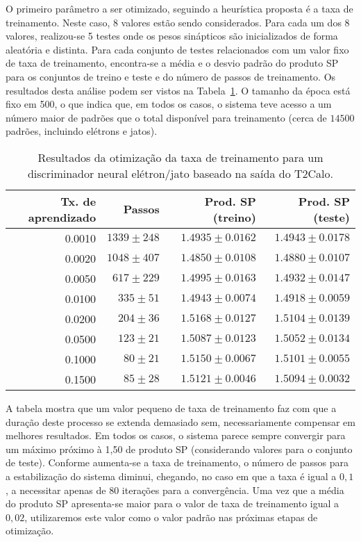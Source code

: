 O primeiro parâmetro a ser otimizado, seguindo a heurística proposta é a taxa
de treinamento. Neste caso, 8 valores estão sendo considerados. Para cada um
dos 8 valores, realizou-se 5 testes onde os pesos sinápticos são inicializados
de forma aleatória e distinta. Para cada conjunto de testes relacionados com
um valor fixo de taxa de treinamento, encontra-se a média e o desvio padrão do
produto SP para os conjuntos de treino e teste e do número de passos de
treinamento. Os resultados desta análise podem ser vistos na
Tabela~\ref{tab:t2calo-neural-lr-scan}. O tamanho da época está fixo em 500, o
que indica que, em todos os casos, o sistema teve acesso a um número maior de
padrões que o total disponível para treinamento (cerca de $14500$ padrões,
incluindo elétrons e jatos).

\begin{table}
\begin{center}
\begin{tabular}{|r|r|r|r|} \hline
Tx. de aprendizado & Passos & Prod. SP (treino) & Prod. SP (teste) \\
\hline 
0.0010 & $1339\pm248$ & $1.4935\pm0.0162$ & $1.4943\pm0.0178$ \\ \hline
0.0020 & $1048\pm407$ & $1.4850\pm0.0108$ & $1.4880\pm0.0107$ \\ \hline
0.0050 & $617\pm229$ & $1.4995\pm0.0163$ & $1.4932\pm0.0147$ \\ \hline
0.0100 & $335\pm51$ & $1.4943\pm0.0074$ & $1.4918\pm0.0059$ \\ \hline
0.0200 & $204\pm36$ & $1.5168\pm0.0127$ & $1.5104\pm0.0139$ \\ \hline
0.0500 & $123\pm21$ & $1.5087\pm0.0123$ & $1.5052\pm0.0134$ \\ \hline
0.1000 & $80\pm21$ & $1.5150\pm0.0067$ & $1.5101\pm0.0055$ \\ \hline
0.1500 & $85\pm28$ & $1.5121\pm0.0046$ & $1.5094\pm0.0032$ \\ \hline
\end{tabular}
\end{center}
\caption{Resultados da otimização da taxa de treinamento para um discriminador
neural elétron/jato baseado na saída do T2Calo.}
\label{tab:t2calo-neural-lr-scan}
\end{table}

A tabela mostra que um valor pequeno de taxa de treinamento faz com que a
duração deste processo se extenda demasiado sem, necessariamente compensar em
melhores resultados. Em todos os casos, o sistema parece sempre convergir para
um máximo próximo à 1,50 de produto SP (considerando valores para o conjunto
de teste). Conforme aumenta-se a taxa de treinamento, o número de passos para
a estabilização do sistema diminui, chegando, no caso em que a taxa é igual a
$0,1$, a necessitar apenas de 80 iterações para a convergência. Uma vez que a
média do produto SP apresenta-se maior para o valor de taxa de treinamento
igual a $0,02$, utilizaremos este valor como o valor padrão nas próximas
etapas de otimização.

